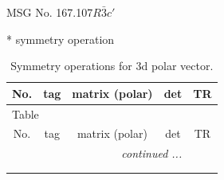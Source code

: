 \documentclass[fleqn,8pt]{jsarticle}
\begin{document}
\setcounter{MaxMatrixCols}{32}

\renewcommand{\tablename}{Table~}
\renewcommand{\figurename}{Figure~}
\begin{center}
\LARGE
MSG No. 167.107\quad$R\bar{3}c'$
\end{center}
* symmetry operation
\renewcommand{\arraystretch}{1.3}
\begin{longtable}{ccccc}
\caption{Symmetry operations for 3d polar vector.}
 \\
 \hline \hline
No. & tag & matrix (polar) & det & TR \\ \hline \endfirsthead

\multicolumn{4}{l}{\tablename\ \thetable{}} \\
 \hline \hline
No. & tag & matrix (polar) & det & TR \\ \hline \endhead

 \hline \hline
\multicolumn{4}{r}{\footnotesize\it continued ...} \\ \endfoot

 \hline \hline
\multicolumn{4}{r}{} \\ \endlastfoot


\end{longtable}
\end{document}
